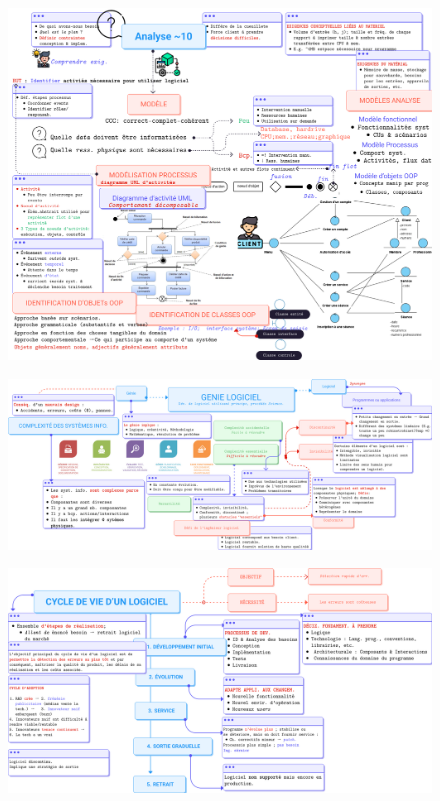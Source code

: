 \documentclass[16pt]{report}
\begin{document}
        \begin{figure}[H]
                \includegraphics[width=1.02\textwidth, height=0.87\textwidth]{IFT2255Chapitre10.png}
        \end{figure}

    \begin{figure}[H]
        \begin{center}
            \includegraphics[width=1\textwidth , height=0.38\textwidth]{IFT22555Chapitre1.jpg}
        \end{center}
    \end{figure}

    \begin{figure}[H]
            \includegraphics[width=1.0\textwidth, height=0.57\textwidth]{IFT2255Chapitre2.png}
    \end{figure}
\end{document}
